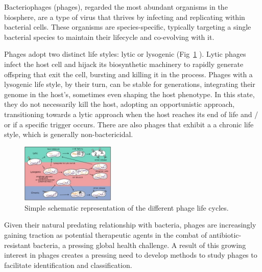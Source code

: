 \documentclass[runningheads]{llncs}
\begin{document}
Bacteriophages (phages), regarded the most abundant organisms in the biosphere, are a type of virus that thrives by infecting and replicating within bacterial cells. \cite{batinovic2019} These organisms are species-specific, typically targeting a single bacterial species to maintain their lifecycle and co-evolving with it. \cite{clokie2011,kasman2022,koskella2014,suttle2005}
%
%

Phages adopt two distinct life styles: lytic or lysogenic (Fig~\ref{fig1} \cite{varona2017}). Lytic phages infect the host cell and hijack its biosynthetic machinery to rapidly generate offspring that exit the cell, bursting and killing it in the process. Phages with a lysogenic life style, by their turn, can be stable for generations, integrating their genome in the host's, sometimes even shaping the host phenotype. In this state, they do not necessarily kill the host, adopting an opportunistic approach, transitioning towards a lytic approach when the host reaches its end of life and / or if a specific trigger occurs. There are also phages that exhibit a a chronic life style, which is generally non-bactericidal. \cite{clokie2011,varona2017,ioannou2023}

\begin{figure}
\begin{center}
\includegraphics[width=0.4\textwidth]{./figures/fig1-lifecycle.jpg}
\caption{Simple schematic representation of the different phage life cycles. \cite{varona2017}} \label{fig1}
\end{center}
\end{figure}

Given their natural predating relationship with bacteria, phages are increasingly gaining traction as potential therapeutic agents in the combat of antibiotic-resistant bacteria, a pressing global health challenge.\cite{ioannou2023,haq2012,gamachu2022,sulakvelidze2001}
%
%
A result of this growing interest in phages creates a pressing need to develop methods to study phages to facilitate identification and classification. 
\end{document}
